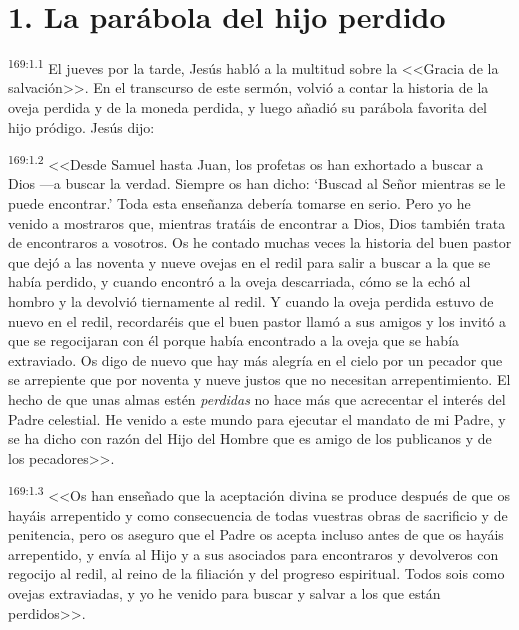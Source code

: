 \section*{1. La parábola del hijo perdido}
\par 
\textsuperscript{169:1.1} El jueves por la tarde, Jesús habló a la multitud sobre la <<Gracia de la salvación>>. En el transcurso de este sermón, volvió a contar la historia de la oveja perdida y de la moneda perdida, y luego añadió su parábola favorita del hijo pródigo. Jesús dijo:

\par 
\textsuperscript{169:1.2} <<Desde Samuel hasta Juan, los profetas os han exhortado a buscar a Dios ---a buscar la verdad. Siempre os han dicho: `Buscad al Señor mientras se le puede encontrar.' Toda esta enseñanza debería tomarse en serio. Pero yo he venido a mostraros que, mientras tratáis de encontrar a Dios, Dios también trata de encontraros a vosotros. Os he contado muchas veces la historia del buen pastor que dejó a las noventa y nueve ovejas en el redil para salir a buscar a la que se había perdido, y cuando encontró a la oveja descarriada, cómo se la echó al hombro y la devolvió tiernamente al redil. Y cuando la oveja perdida estuvo de nuevo en el redil, recordaréis que el buen pastor llamó a sus amigos y los invitó a que se regocijaran con él porque había encontrado a la oveja que se había extraviado. Os digo de nuevo que hay más alegría en el cielo por un pecador que se arrepiente que por noventa y nueve justos que no necesitan arrepentimiento. El hecho de que unas almas estén \textit{perdidas} no hace más que acrecentar el interés del Padre celestial. He venido a este mundo para ejecutar el mandato de mi Padre, y se ha dicho con razón del Hijo del Hombre que es amigo de los publicanos y de los pecadores>>.

\par 
\textsuperscript{169:1.3} <<Os han enseñado que la aceptación divina se produce después de que os hayáis arrepentido y como consecuencia de todas vuestras obras de sacrificio y de penitencia, pero os aseguro que el Padre os acepta incluso antes de que os hayáis arrepentido, y envía al Hijo y a sus asociados para encontraros y devolveros con regocijo al redil, al reino de la filiación y del progreso espiritual. Todos sois como ovejas extraviadas, y yo he venido para buscar y salvar a los que están perdidos>>.

